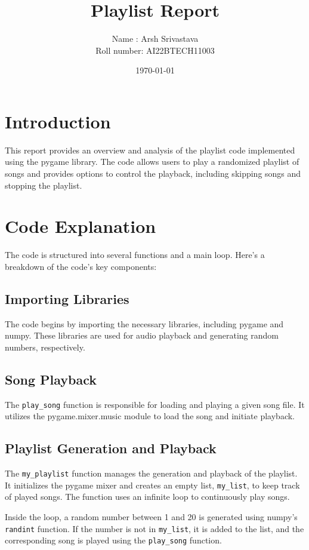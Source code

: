\documentclass{article}
\begin{document}
\title{Playlist Report}
\author{Name : Arsh Srivastava\\Roll number: AI22BTECH11003}
\date{\today}

\maketitle

\section{Introduction}
This report provides an overview and analysis of the playlist code implemented using the pygame library. The code allows users to play a randomized playlist of songs and provides options to control the playback, including skipping songs and stopping the playlist.

\section{Code Explanation}

The code is structured into several functions and a main loop. Here's a breakdown of the code's key components:

\subsection{Importing Libraries}
The code begins by importing the necessary libraries, including pygame and numpy. These libraries are used for audio playback and generating random numbers, respectively.

\subsection{Song Playback}
The \texttt{play\_song} function is responsible for loading and playing a given song file. It utilizes the pygame.mixer.music module to load the song and initiate playback.

\subsection{Playlist Generation and Playback}
The \texttt{my\_playlist} function manages the generation and playback of the playlist. It initializes the pygame mixer and creates an empty list, \texttt{my\_list}, to keep track of played songs. The function uses an infinite loop to continuously play songs.

Inside the loop, a random number between 1 and 20 is generated using numpy's \texttt{randint} function. If the number is not in \texttt{my\_list}, it is added to the list, and the corresponding song is played using the \texttt{play\_song} function.
\end{document}
